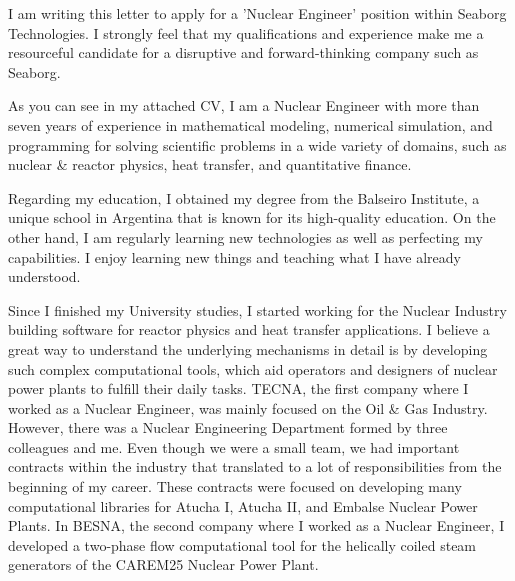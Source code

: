 \documentclass[11pt, a4paper]{templates/awesome-cv}
\begin{document}
\makecvheader[R]

\lfooter{\today}
\rfooter{\thepage/\pageref{LastPage}}
\makecvfooter

\makelettertitle

\begin{cvletter}

I am writing this letter to apply for a 'Nuclear Engineer' position within Seaborg
Technologies. I strongly feel that my qualifications and experience make me a resourceful
candidate for a disruptive and forward-thinking company such as Seaborg.

As you can see in my attached CV, I am a Nuclear Engineer with more than seven years of
experience in mathematical modeling, numerical simulation, and programming for solving
scientific problems in a wide variety of domains, such as nuclear \& reactor physics, heat
transfer, and quantitative finance.

Regarding my education, I obtained my degree from the Balseiro Institute, a unique school in
Argentina that is known for its high-quality education. On the other hand, I am regularly
learning new technologies as well as perfecting my capabilities. I enjoy learning new things
and teaching what I have already understood.

Since I finished my University studies, I started working for the Nuclear Industry building
software for reactor physics and heat transfer applications. I believe a great way to
understand the underlying mechanisms in detail is by developing such complex computational
tools, which aid operators and designers of nuclear power plants to fulfill their daily
tasks. TECNA, the first company where I worked as a Nuclear Engineer, was mainly focused on
the Oil \& Gas Industry. However, there was a Nuclear Engineering Department formed by three
colleagues and me. Even though we were a small team, we had important contracts within the
industry that translated to a lot of responsibilities from the beginning of my career. These
contracts were focused on developing many computational libraries for Atucha I, Atucha II,
and Embalse Nuclear Power Plants. In BESNA, the second company where I worked as a Nuclear
Engineer, I developed a two-phase flow computational tool for the helically coiled steam
generators of the CAREM25 Nuclear Power Plant.


\end{cvletter}
\end{document}
